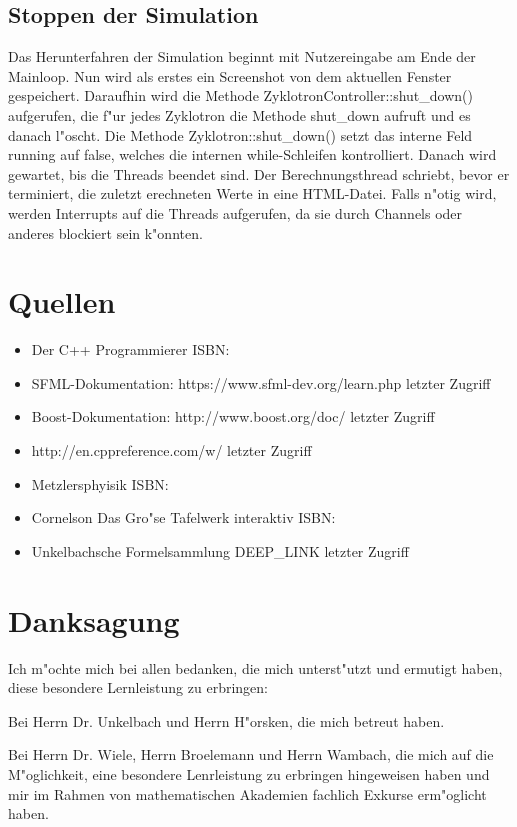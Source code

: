\documentclass[14pt, a4paper]{report}
\begin{document}
\section{Stoppen der Simulation}
Das Herunterfahren der Simulation beginnt mit Nutzereingabe am Ende der Mainloop. Nun wird
als erstes ein Screenshot von dem aktuellen Fenster gespeichert. Daraufhin wird die Methode
ZyklotronController::shut\_down() aufgerufen, die f"ur jedes Zyklotron die Methode shut\_down
aufruft und es danach l"oscht. Die Methode Zyklotron::shut\_down() setzt das interne Feld running
auf false, welches die internen while-Schleifen kontrolliert. Danach wird gewartet, bis die Threads
beendet sind. Der Berechnungsthread schriebt, bevor er terminiert, die zuletzt erechneten Werte in
eine HTML-Datei. Falls n"otig wird, werden Interrupts auf die Threads aufgerufen, da sie durch Channels
oder anderes blockiert sein k"onnten.

\chapter{Quellen}
\begin{itemize}

\item Der C++ Programmierer ISBN: 
\item SFML-Dokumentation: https://www.sfml-dev.org/learn.php letzter Zugriff
\item Boost-Dokumentation: http://www.boost.org/doc/ letzter Zugriff
\item http://en.cppreference.com/w/ letzter Zugriff
\item Metzlersphyisik ISBN:
\item Cornelson Das Gro"se Tafelwerk interaktiv ISBN:
\item Unkelbachsche Formelsammlung DEEP\_LINK letzter Zugriff

\end{itemize}

\chapter{Danksagung}
Ich m"ochte mich bei allen bedanken, die mich unterst"utzt und ermutigt haben, diese
besondere Lernleistung zu erbringen: 

Bei Herrn Dr. Unkelbach und Herrn H"orsken, 
die mich betreut haben. 

Bei Herrn Dr. Wiele, Herrn Broelemann und Herrn Wambach, 
die mich auf die M"oglichkeit, eine besondere Lenrleistung zu erbringen hingeweisen 
haben und mir im
Rahmen von mathematischen Akademien fachlich Exkurse erm"oglicht haben. 
\end{document}
